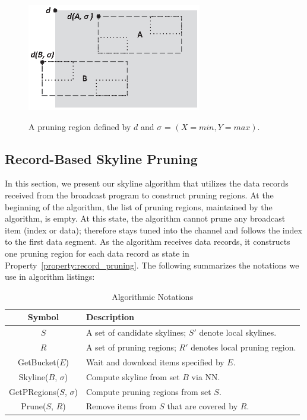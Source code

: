 \begin{figure}
\begin{center}
\includegraphics[width=3in]{Figures/pruning.eps}
\vspace*{-5pt} \caption{A pruning region defined by $d$ and
$\sigma$ = $(X = min, Y = max)$.} \vspace*{-5pt}
\label{fig:pruning}
\end{center}
\end{figure}



\subsection{Record-Based Skyline Pruning}\label{sec-RPS}

In this section, we present our skyline algorithm that utilizes the data records received from the broadcast program to construct pruning regions. At the beginning of the algorithm, the list of pruning regions, maintained by the algorithm, is empty. At this state, the algorithm cannot prune any broadcast item (index or data); therefore stays tuned into the channel and follows the index to the first data segment. As the algorithm receives data records, it constructs one pruning region for each data record as state in Property~\ref{property:record_pruning}. The following summarizes the notations we use in algorithm listings:

\begin{table}[!h]
\centering \caption{Algorithmic Notations}\label{tab:alg}
\begin{tabular}{|c|p{2in}|}
\hline
{\bf Symbol} & {\bf Description}\\
\hline\hline
$S$ & A set of candidate skylines; $S'$ denote local skylines.\\
$R$ & A set of pruning regions; $R'$ denotes local pruning region.\\
GetBucket($E$) & Wait and download items specified by $E$. \\
Skyline($B$, $\sigma$) & Compute skyline from set $B$ via NN. \\
GetPRegions($S$, $\sigma$) & Compute pruning regions from set $S$. \\
Prune($S$, $R$) & Remove items from $S$ that are covered by $R$.\\
\hline
\end{tabular}
\end{table}

